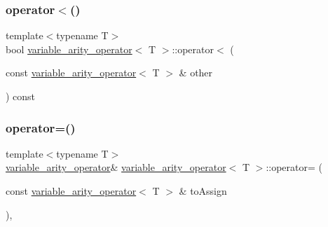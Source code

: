 \mbox{\label{classvariable__arity__operator_a75174e132e55220f4ff58538280c3b80}} 
\subsubsection{\texorpdfstring{operator$<$()}{operator<()}}
{\footnotesize\ttfamily template$<$typename T$>$ \\
bool \mbox{\hyperlink{classvariable__arity__operator}{variable\+\_\+arity\+\_\+operator}}$<$ T $>$\+::operator$<$ (\begin{DoxyParamCaption}\item[{const \mbox{\hyperlink{classvariable__arity__operator}{variable\+\_\+arity\+\_\+operator}}$<$ T $>$ \&}]{other }\end{DoxyParamCaption}) const\hspace{0.3cm}{\ttfamily [inline]}}

\mbox{\label{classvariable__arity__operator_ac202af79e996beb613110b1b6b0572a0}} 
\subsubsection{\texorpdfstring{operator=()}{operator=()}}
{\footnotesize\ttfamily template$<$typename T$>$ \\
\mbox{\hyperlink{classvariable__arity__operator}{variable\+\_\+arity\+\_\+operator}}\& \mbox{\hyperlink{classvariable__arity__operator}{variable\+\_\+arity\+\_\+operator}}$<$ T $>$\+::operator= (\begin{DoxyParamCaption}\item[{const \mbox{\hyperlink{classvariable__arity__operator}{variable\+\_\+arity\+\_\+operator}}$<$ T $>$ \&}]{to\+Assign }\end{DoxyParamCaption})\hspace{0.3cm}{\ttfamily [inline]}, {\ttfamily [protected]}}

\mbox{\label{classvariable__arity__operator_a02ba776fcea71188e25e1144c818df88}} 
